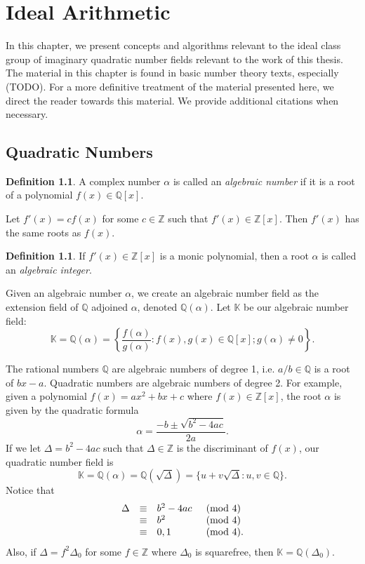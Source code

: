 \documentclass{ucalgthes1}
\theoremstyle{plain}
\theoremstyle{definition}
\newtheorem{defn}[thm]{Definition}
\newcommand{\KK}{\mathbb{K}}
\newcommand{\ZZ}{\mathbb{Z}}
\newcommand{\QQ}{\mathbb{Q}}
\begin{document}
\setcounter{chapter}{1}
\chapter{Ideal Arithmetic}

In this chapter, we present concepts and algorithms relevant to the ideal class group of imaginary quadratic number fields relevant to the work of this thesis.  The material in this chapter is found in basic number theory texts, especially (TODO).  For a more definitive treatment of the material presented here, we direct the reader towards this material.  We provide additional citations when necessary.  

\section{Quadratic Numbers}

\begin{defn}
A complex number $\alpha$ is called an \emph{algebraic number} if it is a root of a polynomial $f(x) \in \QQ[x]$.
\end{defn}
Let $f'(x) = cf(x)$ for some $c \in \ZZ$ such that $f'(x) \in \ZZ[x]$.  Then $f'(x)$ has the same roots as $f(x)$.  
\begin{defn}
If $f'(x) \in \ZZ[x]$ is a monic polynomial, then a root $\alpha$ is called an \emph{algebraic integer}. 
\end{defn}
Given an algebraic number $\alpha$, we create an algebraic number field as the extension field of $\QQ$ adjoined $\alpha$, denoted $\QQ(\alpha)$. Let $\KK$ be our algebraic number field:
\[
	\KK = \QQ(\alpha) = \left\{ \frac{f(\alpha)}{g(\alpha)} : f(x), g(x) \in \QQ[x]; g(\alpha) \ne 0 \right\}.
\]

\bigbreak
The rational numbers $\QQ$ are algebraic numbers of degree 1, i.e. $a/b \in \QQ$ is a root of $bx - a$.  Quadratic numbers are algebraic numbers of degree 2.  For example, given a polynomial $f(x) = ax^2 + bx + c$ where $f(x) \in \ZZ[x]$, the root $\alpha$ is given by the quadratic formula
\[
	\alpha = \frac{-b \pm \sqrt{b^2 - 4ac}}{2a}.
\]
If we let $\Delta = b^2 -4ac$ such that $\Delta \in \ZZ$ is the discriminant of $f(x)$, our quadratic number field is 
\[
	\KK = \QQ(\alpha) = \QQ(\sqrt{\Delta}) = \{u + v\sqrt{\Delta} : u,v \in \QQ\}.
\]
Notice that
\begin{eqnarray*}
\begin{array}{l l l l}
	\Delta & \equiv & b^2-4ac & \pmod 4 \\
	& \equiv & b^2 & \pmod 4 \\
	& \equiv & 0,1 & \pmod 4.
\end{array}
\end{eqnarray*}
Also, if $\Delta = f^2 \Delta_0$ for some $f \in \ZZ$ where $\Delta_0$ is squarefree, then $\KK = \QQ(\Delta_0)$.
\end{document}
